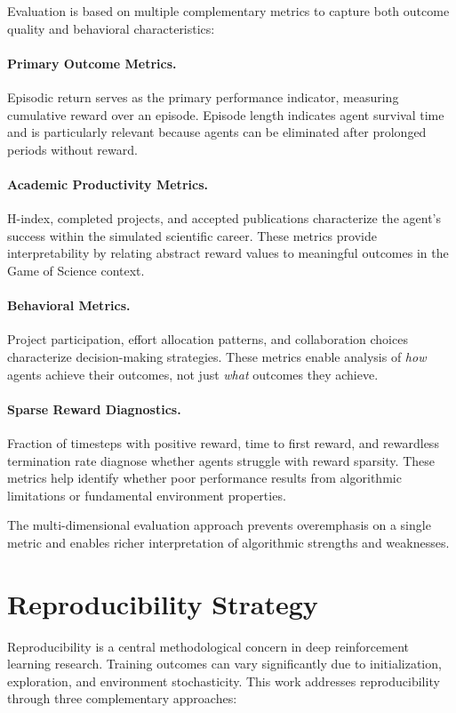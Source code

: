 \documentclass[english,bachelor]{hsluthesis}
\begin{document}
Evaluation is based on multiple complementary metrics to capture both outcome quality and behavioral characteristics:

\paragraph{Primary Outcome Metrics.}
Episodic return serves as the primary performance indicator, measuring cumulative reward over an episode. Episode length indicates agent survival time and is particularly relevant because agents can be eliminated after prolonged periods without reward.

\paragraph{Academic Productivity Metrics.}
H-index, completed projects, and accepted publications characterize the agent's success within the simulated scientific career. These metrics provide interpretability by relating abstract reward values to meaningful outcomes in the Game of Science context.

\paragraph{Behavioral Metrics.}
Project participation, effort allocation patterns, and collaboration choices characterize decision-making strategies. These metrics enable analysis of \emph{how} agents achieve their outcomes, not just \emph{what} outcomes they achieve.

\paragraph{Sparse Reward Diagnostics.}
Fraction of timesteps with positive reward, time to first reward, and rewardless termination rate diagnose whether agents struggle with reward sparsity. These metrics help identify whether poor performance results from algorithmic limitations or fundamental environment properties.

The multi-dimensional evaluation approach prevents overemphasis on a single metric and enables richer interpretation of algorithmic strengths and weaknesses.

\section{Reproducibility Strategy}

Reproducibility is a central methodological concern in deep reinforcement learning research. Training outcomes can vary significantly due to initialization, exploration, and environment stochasticity. This work addresses reproducibility through three complementary approaches:
\end{document}
